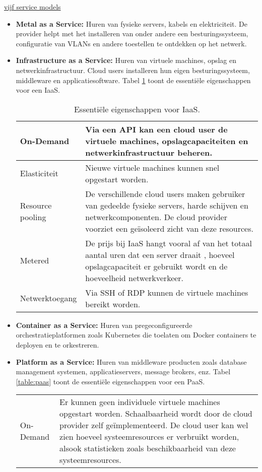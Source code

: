 	\underline{vijf service models}
	\begin{itemize}
		\item  \textbf{Metal as a Service:} Huren van fysieke servers, kabels en elektriciteit. De provider helpt met het installeren van onder andere een besturingssysteem, configuratie van VLANs en andere toestellen te ontdekken op het netwerk.
		\item  \textbf{Infrastructure as a Service:} Huren van virtuele machines, opslag en netwerkinfrastructuur. Cloud users installeren hun eigen besturingssysteem, middleware en applicatiesoftware. Tabel \ref{table:iaas} toont de essentiële eigenschappen voor een IaaS.
		\begin{table}[ht]
			\centering
			\begin{tabular}{l | p{}}
				\hline
				On-Demand & Via een API kan een cloud user de virtuele machines, opslagcapaciteiten en netwerkinfrastructuur beheren.\\
				\hline
				Elasticiteit & Nieuwe virtuele machines kunnen snel opgestart worden.\\
				\hline
				Resource pooling & De verschillende cloud users maken gebruiker van gedeelde fysieke servers, harde schijven en netwerkcomponenten. De cloud provider voorziet een geïsoleerd zicht van deze resources.\\
				\hline
				Metered & De prijs bij IaaS hangt vooral af van het totaal aantal uren dat een server draait , hoeveel opslagcapaciteit er gebruikt wordt en de hoeveelheid netwerkverkeer. \\
				\hline
				Netwerktoegang & Via SSH of RDP kunnen de virtuele machines bereikt worden. \\
				\hline 
			\end{tabular}
			\caption{Essentiële eigenschappen voor IaaS.}
			\label{table:iaas}
		\end{table}
		\item  \textbf{Container as a Service:} Huren van pregeconfigureerde orchestratieplatformen zoals Kubernetes die toelaten om Docker containers te deployen en te orkestreren. 
		\item  \textbf{Platform as a Service:} Huren van middleware producten zoals database management systemen, applicatieservers, message brokers, enz. Tabel \ref{table:paas} toont de essentiële eigenschappen voor een PaaS. 
		\begin{table}[ht]
			\centering
			\begin{tabular}{l | p{}}
				\hline
				On-Demand & Er kunnen geen individuele virtuele machines opgestart worden. Schaalbaarheid wordt door de cloud provider zelf geïmplementeerd. De cloud user kan wel zien hoeveel systeemresources er verbruikt worden, alsook statistieken zoals beschikbaarheid van deze systeemresources.  \\

\end{tabular}
\end{table}
\end{itemize}
